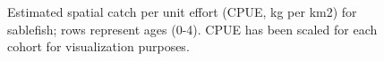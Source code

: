\documentclass[
]{article}
\begin{document}
\begin{figure}


\caption{\label{fig-sablefish-spatial-composition-all}Estimated spatial
catch per unit effort (CPUE, kg per km2) for sablefish; rows represent
ages (0-4). CPUE has been scaled for each cohort for visualization
purposes.}

\end{figure}%

\newpage
\end{document}
